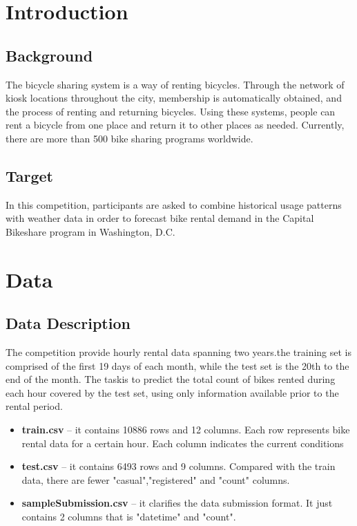 \section{Introduction}\label{sec-intro}

\subsection{Background}
The bicycle sharing system is a way of renting bicycles. Through the network of kiosk locations throughout the city, membership is automatically obtained, and the process of renting and returning bicycles. Using these systems, people can rent a bicycle from one place and return it to other places as needed. Currently, there are more than 500 bike sharing programs worldwide.\\

\subsection{Target}
In this competition, participants are asked to combine historical usage patterns with weather data in order to forecast bike rental demand in the Capital Bikeshare program in Washington, D.C.

\section{Data} \label{sec-preliminaries}
\subsection{Data Description}
The competition provide hourly rental data spanning two years.the training set is comprised of the first 19 days of each month, while the test set is the 20th to the end of the month. The taskis to predict the total count of bikes rented during each hour covered by the test set, using only information available prior to the rental period.\\

\begin{itemize}
	\smallskip
	\item \textbf{train.csv} -- it contains 10886 rows and 12 columns. Each row represents bike rental data for a certain hour. Each column indicates the current conditions
	\smallskip
	\item \textbf{test.csv} -- it contains 6493 rows and 9 columns. Compared with the train data, there are fewer "casual","registered" and "count" columns.
	\smallskip
	\item \textbf{sampleSubmission.csv} -- it clarifies the data submission format. It just contains 2 columns that is "datetime" and "count".
\end{itemize}

